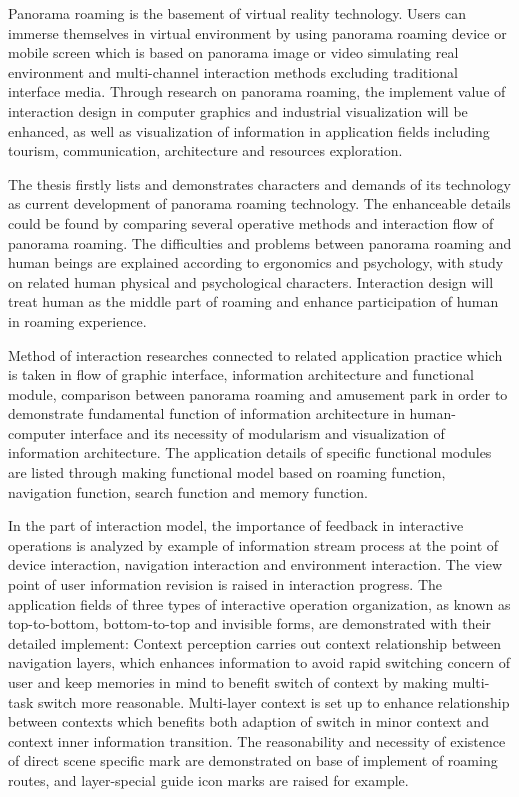 \begin{enabstract}
\begin{spacing}{1.0}
\xiaosi
\setlength{\baselineskip}{20pt}
Panorama roaming is the basement of virtual reality technology. Users can immerse themselves in virtual environment by using panorama roaming device or mobile screen which is based on panorama image or video simulating real environment and multi-channel interaction methods excluding traditional interface media. Through research on panorama roaming, the implement value of interaction design in computer graphics and industrial visualization will be enhanced, as well as visualization of information in application fields including tourism, communication, architecture and resources exploration.

The thesis firstly lists and demonstrates characters and demands of its technology as current development of panorama roaming technology. The enhanceable details could be found by comparing several operative methods and interaction flow of panorama roaming. The difficulties and problems between panorama roaming and human beings are explained according to ergonomics and psychology, with study on related human physical and psychological characters. Interaction design will treat human as the middle part of roaming and enhance participation of human in roaming experience.

Method of interaction researches connected to related application practice which is taken in flow of graphic interface, information architecture and functional module, comparison between panorama roaming and amusement park in order to demonstrate fundamental function of information architecture in human-computer interface and its necessity of modularism and visualization of information architecture. The application details of specific functional modules are listed through making functional model based on roaming function, navigation function, search function and memory function.

In the part of interaction model, the importance of feedback in interactive operations is analyzed by example of information stream process at the point of device interaction, navigation interaction and environment interaction. The view point of user information revision is raised in interaction progress. The application fields of three types of interactive operation organization, as known as top-to-bottom, bottom-to-top and invisible forms, are demonstrated with their detailed implement: Context perception carries out context relationship between navigation layers, which enhances information to avoid rapid switching concern of user and keep memories in mind to benefit switch of context by making multi-task switch more reasonable. Multi-layer context is set up to enhance relationship between contexts which benefits both adaption of switch in minor context and context inner information transition. The reasonability and necessity of existence of direct scene specific mark are demonstrated on base of implement of roaming routes, and layer-special guide icon marks are raised for example.


\end{spacing}
\end{enabstract}
